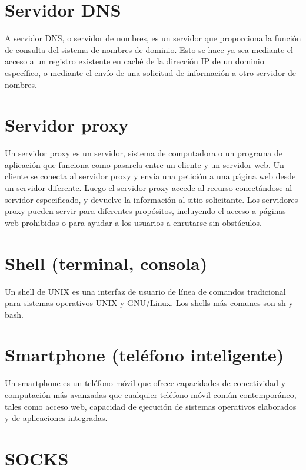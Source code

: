 \documentclass[10pt,a5paper,twoside,,]{book}
\begin{document}
\section{Servidor DNS}\label{servidor-dns}

A servidor DNS, o servidor de nombres, es un servidor que proporciona la
función de consulta del sistema de nombres de dominio. Esto se hace ya
sea mediante el acceso a un registro existente en caché de la dirección
IP de un dominio específico, o mediante el envío de una solicitud de
información a otro servidor de nombres.

\section{Servidor proxy}\label{servidor-proxy}

Un servidor proxy es un servidor, sistema de computadora o un programa
de aplicación que funciona como pasarela entre un cliente y un servidor
web. Un cliente se conecta al servidor proxy y envía una petición a una
página web desde un servidor diferente. Luego el servidor proxy accede
al recurso conectándose al servidor especificado, y devuelve la
información al sitio solicitante. Los servidores proxy pueden servir
para diferentes propósitos, incluyendo el acceso a páginas web
prohibidas o para ayudar a los usuarios a enrutarse sin obstáculos.

\section{Shell (terminal, consola)}\label{shell-terminal-consola}

Un shell de UNIX es una interfaz de usuario de línea de comandos
tradicional para sistemas operativos UNIX y GNU/Linux. Los shells más
comunes son sh y bash.

\section{Smartphone (teléfono
inteligente)}\label{smartphone-teluxe9fono-inteligente}

Un smartphone es un teléfono móvil que ofrece capacidades de
conectividad y computación más avanzadas que cualquier teléfono móvil
común contemporáneo, tales como acceso web, capacidad de ejecución de
sistemas operativos elaborados y de aplicaciones integradas.

\section{SOCKS}\label{socks}
\end{document}
